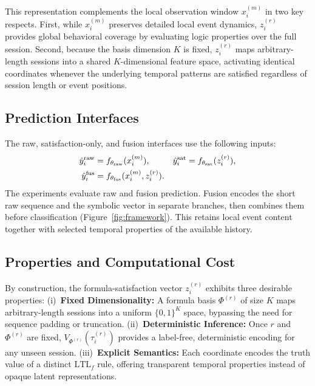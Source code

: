 \documentclass[sigconf,anonymous,nonacm]{acmart}
\newif\ifrevisions
\newcommand{\rev}[1]{\ifrevisions\textcolor{red}{#1}\else#1\fi}
\begin{document}
This representation complements the local observation window $x_i^{(m)}$ in two key respects. First, while $x_i^{(m)}$ preserves detailed local event dynamics, $z_i^{(r)}$ provides global behavioral coverage by evaluating logic properties over the full session. Second, because the basis dimension $K$ is fixed, $z_i^{(r)}$ maps arbitrary-length sessions into a shared $K$-dimensional feature space, activating identical coordinates whenever the underlying temporal patterns are satisfied regardless of session length or event positions.



\subsection{Prediction Interfaces}
\label{sec:prediction_interfaces}

\rev{The raw, satisfaction-only, and fusion interfaces use the following inputs:
\begin{align}
\hat y_i^{\rm raw}&=f_{\theta_{\rm raw}}(x_i^{(m)}), &
\hat y_i^{\rm sat}&=f_{\theta_{\rm sat}}(z_i^{(r)}),\notag\\
\hat y_i^{\rm fus}&=f_{\theta_{\rm fus}}(x_i^{(m)},z_i^{(r)}).
\end{align}
The experiments evaluate raw and fusion prediction. Fusion encodes the short raw sequence and the symbolic vector in separate branches, then combines them before classification (Figure~\ref{fig:framework}). This retains local event content together with selected temporal properties of the available history.}

\subsection{Properties and Computational Cost}
\label{sec:properties_cost}

By construction, the formula-satisfaction vector $z_i^{(r)}$ exhibits three desirable properties: (i)~\textbf{Fixed Dimensionality:} A formula basis $\Phi^{(r)}$ of size $K$ maps arbitrary-length sessions into a uniform $\{0,1\}^K$ space, bypassing the need for sequence padding or truncation. (ii)~\textbf{Deterministic Inference:} Once $r$ and $\Phi^{(r)}$ are fixed, $V_{\Phi^{(r)}}(\tau_i^{(r)})$ provides a label-free, deterministic encoding for any unseen session. (iii)~\textbf{Explicit Semantics:} Each coordinate encodes the truth value of a distinct $\mathrm{LTL}_f$ rule, offering transparent temporal properties instead of opaque latent representations.
\end{document}
